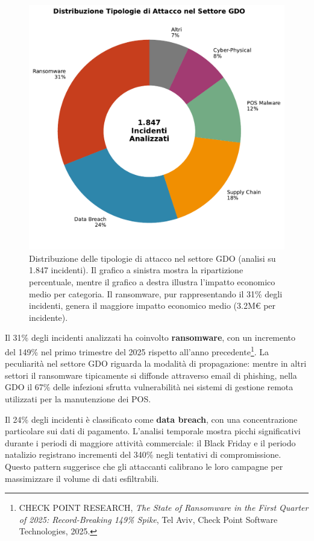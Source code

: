 \begin{figure}[htbp]
\centering
\includegraphics[width=\textwidth]{thesis_figures/cap2/fig_2_2_attack_types.pdf}
\caption{Distribuzione delle tipologie di attacco nel settore GDO (analisi su 1.847 incidenti). Il grafico a sinistra mostra la ripartizione percentuale, mentre il grafico a destra illustra l'impatto economico medio per categoria. Il ransomware, pur rappresentando il 31\% degli incidenti, genera il maggiore impatto economico medio (3.2M€ per incidente).}
\label{fig:attack_types}
\end{figure}

Il 31\% degli incidenti analizzati ha coinvolto \textbf{ransomware}, con un incremento del 149\% nel primo trimestre del 2025 rispetto all'anno precedente\footnote{CHECK POINT RESEARCH, \textit{The State of Ransomware in the First Quarter of 2025: Record-Breaking 149\% Spike}, Tel Aviv, Check Point Software Technologies, 2025.}. La peculiarità nel settore GDO riguarda la modalità di propagazione: mentre in altri settori il ransomware tipicamente si diffonde attraverso email di phishing, nella GDO il 67\% delle infezioni sfrutta vulnerabilità nei sistemi di gestione remota utilizzati per la manutenzione dei POS.

Il 24\% degli incidenti è classificato come \textbf{data breach}, con una concentrazione particolare sui dati di pagamento. L'analisi temporale mostra picchi significativi durante i periodi di maggiore attività commerciale: il Black Friday e il periodo natalizio registrano incrementi del 340\% negli tentativi di compromissione. Questo pattern suggerisce che gli attaccanti calibrano le loro campagne per massimizzare il volume di dati esfiltrabili.

